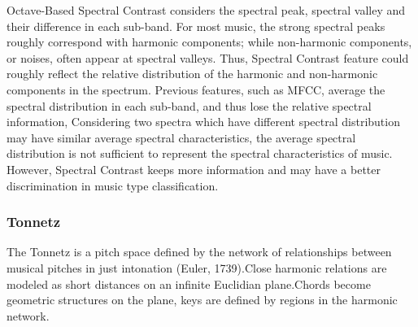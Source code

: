 \documentclass[11pt]{article}
\begin{document}
Octave-Based Spectral Contrast considers the spectral peak, spectral
valley and their difference in each sub-band. For most music, the strong
spectral peaks roughly correspond with harmonic components; while
non-harmonic components, or noises, often appear at spectral valleys.
Thus, Spectral Contrast feature could roughly reflect the relative
distribution of the harmonic and non-harmonic components in the
spectrum. Previous features, such as MFCC, average the spectral
distribution in each sub-band, and thus lose the relative spectral
information, Considering two spectra which have different spectral
distribution may have similar average spectral characteristics, the
average spectral distribution is not sufficient to represent the
spectral characteristics of music. However, Spectral Contrast keeps more
information and may have a better discrimination in music type
classification.

\hypertarget{tonnetz}{%
\subsubsection{\texorpdfstring{Tonnetz}{Tonnetz }}\label{tonnetz}}

The Tonnetz is a pitch space defined by the network of relationships
between musical pitches in just intonation (Euler, 1739).Close harmonic
relations are modeled as short distances on an infinite Euclidian
plane.Chords become geometric structures on the plane, keys are defined
by regions in the harmonic network.
\end{document}
